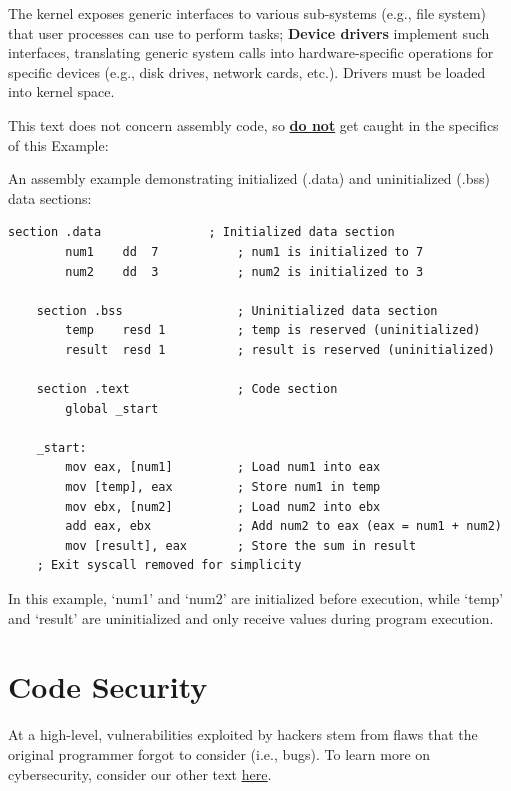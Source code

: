 \begin{Def}

  The kernel exposes generic interfaces to various sub-systems (e.g., file system) that user processes can use to perform tasks; \textbf{Device drivers} implement such interfaces,
  translating generic system calls into hardware-specific operations for specific devices (e.g., disk drives, network cards, etc.). Drivers must be loaded into kernel space.
\end{Def}

\noindent
This text does not concern assembly code, so \underline{\textbf{do not}} get caught in the specifics of this Example: 
\begin{Example}

    \label{ex:assembly_code}
    An assembly example demonstrating initialized (.data) and uninitialized (.bss) data sections:

    \begin{lstlisting}[language={[x86masm]Assembler}, numbers=none]
    section .data               ; Initialized data section
        num1    dd  7           ; num1 is initialized to 7
        num2    dd  3           ; num2 is initialized to 3

    section .bss                ; Uninitialized data section
        temp    resd 1          ; temp is reserved (uninitialized)
        result  resd 1          ; result is reserved (uninitialized)

    section .text               ; Code section
        global _start

    _start:
        mov eax, [num1]         ; Load num1 into eax
        mov [temp], eax         ; Store num1 in temp
        mov ebx, [num2]         ; Load num2 into ebx
        add eax, ebx            ; Add num2 to eax (eax = num1 + num2)
        mov [result], eax       ; Store the sum in result
    ; Exit syscall removed for simplicity
    \end{lstlisting}

    \noindent
    In this example, `num1' and `num2' are initialized before execution, while `temp' and `result' are uninitialized and only receive values during program execution.
\end{Example}

\newpage 
\section{Code Security}

At a high-level, vulnerabilities exploited by hackers stem from flaws that the original programmer forgot to consider (i.e., bugs).
To learn more on cybersecurity, consider our other text \underline{\href{https://github.com/Concise-Works/Cyber-Security/blob/main/main.pdf}{here}}.

